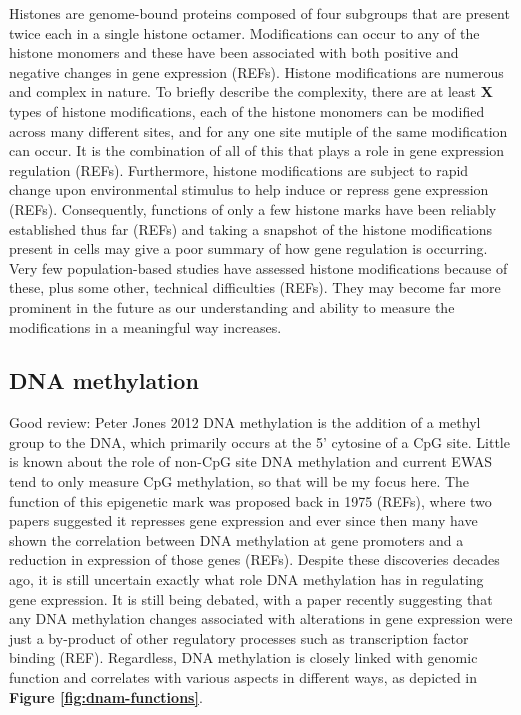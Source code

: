 \documentclass[11pt,twoside]{bristolthesis}
\begin{document}
Histones are genome-bound proteins composed of four subgroups that are present twice each in a single histone octamer. Modifications can occur to any of the histone monomers and these have been associated with both positive and negative changes in gene expression (REFs). Histone modifications are numerous and complex in nature. To briefly describe the complexity, there are at least \textbf{X} types of histone modifications, each of the histone monomers can be modified across many different sites, and for any one site mutiple of the same modification can occur. It is the combination of all of this that plays a role in gene expression regulation (REFs). Furthermore, histone modifications are subject to rapid change upon environmental stimulus to help induce or repress gene expression (REFs). Consequently, functions of only a few histone marks have been reliably established thus far (REFs) and taking a snapshot of the histone modifications present in cells may give a poor summary of how gene regulation is occurring. Very few population-based studies have assessed histone modifications because of these, plus some other, technical difficulties (REFs). They may become far more prominent in the future as our understanding and ability to measure the modifications in a meaningful way increases.

\hypertarget{dna-methylation}{%
\subsection{DNA methylation}\label{dna-methylation}}

Good review: Peter Jones 2012
DNA methylation is the addition of a methyl group to the DNA, which primarily occurs at the 5' cytosine of a CpG site. Little is known about the role of non-CpG site DNA methylation and current EWAS tend to only measure CpG methylation, so that will be my focus here. The function of this epigenetic mark was proposed back in 1975 (REFs), where two papers suggested it represses gene expression and ever since then many have shown the correlation between DNA methylation at gene promoters and a reduction in expression of those genes (REFs). Despite these discoveries decades ago, it is still uncertain exactly what role DNA methylation has in regulating gene expression. It is still being debated, with a paper recently suggesting that any DNA methylation changes associated with alterations in gene expression were just a by-product of other regulatory processes such as transcription factor binding (REF). Regardless, DNA methylation is closely linked with genomic function and correlates with various aspects in different ways, as depicted in \textbf{Figure \ref{fig:dnam-functions}}.
\end{document}
